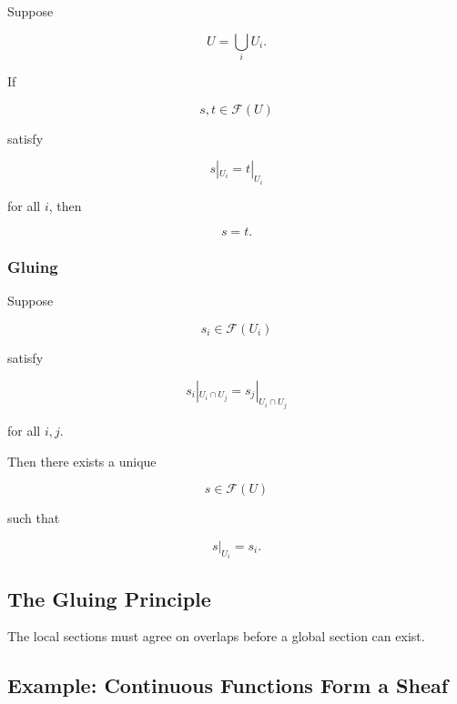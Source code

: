 \documentclass[12pt,a4paper]{article}
\theoremstyle{notespace}
\begin{document}
Suppose

\[
U=\bigcup_i U_i.
\]

If

\[
s,t\in \mathcal F(U)
\]

satisfy

\[
s|_{U_i}=t|_{U_i}
\]

for all \(i\), then

\[
s=t.
\]

\subsubsection*{Gluing}

Suppose

\[
s_i\in\mathcal F(U_i)
\]

satisfy

\[
s_i|_{U_i\cap U_j}
=
s_j|_{U_i\cap U_j}
\]

for all \(i,j\).

Then there exists a unique

\[
s\in\mathcal F(U)
\]

such that

\[
s|_{U_i}=s_i.
\]

\subsection{The Gluing Principle}

\begin{center}
\end{center}

The local sections must agree on overlaps before a global section can exist.

\subsection{Example: Continuous Functions Form a Sheaf}
\end{document}
